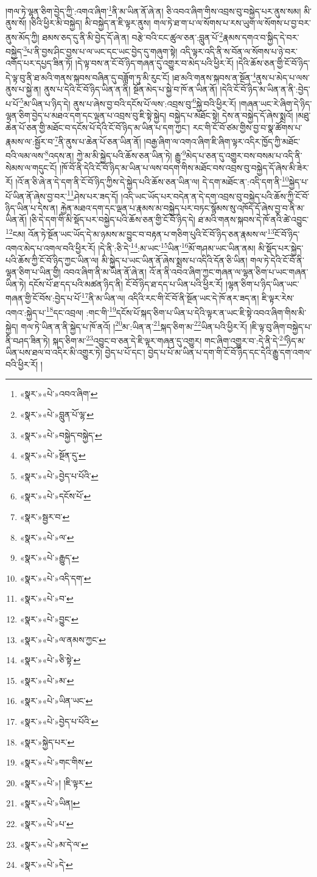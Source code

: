 །གལ་ཏེ་ལྷན་ཅིག་བྱེད་ཀྱི་:འགའ་ཞིག་\footnote{«སྣར་»«པེ་»འབའ་ཞིག་}ནི་མ་ཡིན་ནོ་ཞེ་ན། ཅི་འབའ་ཞིག་གིས་འབྲས་བུ་བསྐྱེད་པར་ནུས་སམ། མི་ནུས་སོ། །ཅིའི་ཕྱིར་མི་བསྐྱེད། མི་བསྐྱེད་ན་ཇི་ལྟར་ནུས། གལ་ཏེ་ཐ་ག་པ་ལ་སོགས་པ་རས་ཡུག་ལ་སོགས་པ་བྱ་བར་ནུས་མོད་ཀྱི། ཐམས་ཅད་དུ་ནི་མི་བྱེད་དོ་ཞེ་ན། བརྩེ་བའི་ངང་ཚུལ་ཅན་:བླུན་པོ་\footnote{«སྣར་»«པེ་»བླུན་པོ་ལྷ་}རྣམས་དགའ་བ་སྐྱིད་དེ་བར་བསྐྱེད་\footnote{«སྣར་»«པེ་»བསྐྱེད་བསྐྱེད་}པ་ནི་བྱས་ཤིང་བྱས་པ་ལ་ཡང་དང་ཡང་བྱེད་དུ་གཞུག་སྟེ། འདི་ལྟར་འདི་ནི་ས་བོན་ལ་སོགས་པ་ཉེ་བར་འགོད་པར་དཔྱད་ཟིན་ཏོ། །དེ་ལྟ་བས་ན་ངོ་བོ་ཉིད་གཞན་དུ་འགྱུར་བ་མེད་པའི་ཕྱིར་རོ། །དེའི་ཆོས་ཅན་གྱི་ངོ་བོ་ཉིད་དེ་ལྟ་བུ་ནི་ཐ་མའི་གནས་སྐབས་བཞིན་དུ་བཟློག་ཏུ་མི་རུང་ངོ། །ཐ་མའི་གནས་སྐབས་ན་སྔོན་\footnote{«སྣར་»«པེ་»སྔོན་དུ་}ནུས་པ་མེད་པ་ལས་ནུས་པ་སྐྱེ་ན། ནུས་པ་དེའི་ངོ་བོ་ཉིད་ཡིན་ན་ནི། སྔོན་མེད་པ་སྐྱེ་བ་ཁོ་ན་ཡིན་ནོ། །དེའི་ངོ་བོ་ཉིད་མ་ཡིན་ན་ནི་:བྱེད་པ་པོ་\footnote{«སྣར་»«པེ་»བྱེད་པ་པོའི་}མ་ཡིན་པ་ཉིད་དེ། ནུས་པ་ཞེས་བྱ་བའི་དངོས་པོ་ལས་:འབྲས་བུ་\footnote{«སྣར་»«པེ་»དངོས་པོ་}སྐྱེ་བའི་ཕྱིར་རོ། །གཞན་ཡང་རེ་ཞིག་དེ་ཉིད་ལྷན་ཅིག་བྱེད་པ་མཐའ་དག་དང་ལྡན་པ་འབྲས་བུ་ཇི་སྟེ་སྐྱེད། བསྐྱེད་པ་མཐོང་སྟེ། དེས་ན་བསྐྱེད་དོ་ཞེས་སྨྲའོ། །མཐུ་ཆེན་པོ་ཅན་གྱི་མཐོང་བ་དངོས་པོ་དེའི་ངོ་བོ་ཉིད་མ་ཡིན་པ་དག་ཀྱང་། རང་གི་ངོ་བོ་ཙམ་གྱིས་བྱ་བ་སྣ་ཚོགས་པ་རྣམས་ལ་:སྦྱོར་བ་\footnote{«སྣར་»སྦྱར་བ་}ནི་ནུས་པ་ཆེན་པོ་ཅན་ཡིན་ནོ། །བརྒྱ་ཞིག་ལ་འགའ་ཞིག་ཇི་ཞིག་ལྟར་འདིར་ཁྱོད་ཀྱི་མཐོང་བའི་ལམ་ལས་\footnote{«སྣར་»«པེ་»ལ་}འདས་ན། ཀྱེ་མ་མི་སྐྱེད་པའི་ཆོས་ཅན་ཡིན་ཏེ། རྒྱུ་\footnote{«སྣར་»«པེ་»རྒྱུད་}མེད་པ་ཅན་དུ་འགྱུར་བས་བསམ་པ་འདི་ནི་སེམས་ལ་གདུང་ངོ། །ཁོ་བོ་ནི་དེའི་ངོ་བོ་ཉིད་མ་ཡིན་པ་ལས་བདག་གིས་མཐོང་བས་འབྲས་བུ་བསྐྱེད་དོ་ཞེས་མི་ཟེར་རོ། །འོ་ན་ཅི་ཞེ་ན་དེ་དག་ནི་ངོ་བོ་ཉིད་ཀྱིས་དེ་སྐྱེད་པའི་ཆོས་ཅན་ཡིན་ལ། དེ་དག་མཐོང་ན་:འདི་དག་ནི་\footnote{«སྣར་»«པེ་»འདི་དག་}སྐྱེད་པ་པོ་ཡིན་ནོ་ཞེས་བྱ་བར་\footnote{«སྣར་»«པེ་»བ་}ཤེས་པར་ཟད་དོ། །འདི་ཡང་ཡོད་པར་བདེན་ན་དེ་དག་འབྲས་བུ་བསྐྱེད་པའི་ཆོས་ཀྱི་ངོ་བོ་ཉིད་ཡིན་པ་དེས་ན། རྐྱེན་མཐའ་དག་དང་ལྡན་པ་རྣམས་མ་བསྐྱེད་པར་བཏང་སྙོམས་སུ་འཁོད་དོ་ཞེས་བྱ་བ་ནི་མ་ཡིན་ནོ། །ཅི་དེ་དག་གི་མི་སྡོད་པར་བསྐྱེད་པའི་ཆོས་ཅན་གྱི་ངོ་བོ་ཉིད་དེ། ཐ་མའི་གནས་སྐབས་དེ་ཁོ་ནའི་ཚེ་འབྱུང་\footnote{«སྣར་»«པེ་»བྱུང་}ངམ། འོན་ཏེ་སྔོན་ཡང་ཡོད་དེ་མ་ཉམས་མ་བྱུང་བ་བརྟན་པ་གཅིག་པུའི་ངོ་བོ་ཉིད་ཅན་རྣམས་ལ་\footnote{«སྣར་»«པེ་»ལ་ནམས་ཀྱང་}ངོ་བོ་ཉིད་འགའ་མེད་པ་འགལ་བའི་ཕྱིར་རོ། །དེ་ནི་:ཅི་དེ་\footnote{«སྣར་»«པེ་»ཅི་སྟེ་}:མ་ཡང་\footnote{«སྣར་»«པེ་»མ་}ཡིན་\footnote{«སྣར་»«པེ་»ཡིན་ཡང་}མོ་གཤམ་ཡང་ཡིན་ནམ། མི་སྡོད་པར་སྐྱེད་པའི་ཆོས་ཀྱི་ངོ་བོ་ཉིད་ཀྱང་ཡིན་ལ། མི་སྐྱེད་པ་ཡང་ཡིན་ནོ་ཞེས་སྨྲས་པ་འདིའི་དོན་ཅི་ཡིན། གལ་ཏེ་དེའི་ངོ་བོ་ནི་ལྷན་ཅིག་པ་ཡིན་གྱི། འབའ་ཞིག་ནི་མ་ཡིན་ནོ་ཞེ་ན། འོ་ན་ནི་འབའ་ཞིག་ཀྱང་གཞན་ལ་ལྷན་ཅིག་པ་ཡང་གཞན་ཡིན་ཏེ། དངོས་པོ་ཐ་དད་པའི་མཚན་ཉིད་ནི། ངོ་བོ་ཉིད་ཐ་དད་པ་ཡིན་པའི་ཕྱིར་རོ། །ལྷན་ཅིག་པ་ཉིད་ཡིན་ཡང་གཞན་གྱི་ངོ་བོས་:བྱེད་པ་པོ་\footnote{«སྣར་»«པེ་»བྱེད་པ་པོའི་}ནི་མ་ཡིན་ལ། འདིའི་རང་གི་ངོ་བོ་ནི་སྔོན་ཡང་དེ་ཁོ་ནར་ཟད་ན། ཇི་ལྟར་རེས་འགའ་:སྐྱེད་པ་\footnote{«སྣར་»སྐྱེད་པར་}དང་འབྲལ། :གང་གི་\footnote{«སྣར་»«པེ་»གང་གིས་}དངོས་པོ་སྐད་ཅིག་པ་ཡིན་པ་དེའི་ལྟར་ན་ཡང་ཇི་སྟེ་འབའ་ཞིག་གིས་མི་སྐྱེད། གལ་ཏེ་ཡིན་ན་ནི་སྐྱེད་པ་ཁོ་ནའོ། །\footnote{«སྣར་»«པེ་»། །ཇི་ལྟར་}མ་:ཡིན་ན་\footnote{«སྣར་»«པེ་»ཡིན། }སྐད་ཅིག་མ་\footnote{«སྣར་»«པེ་»པ་}ཡིན་པའི་ཕྱིར་རོ། །ཇི་ལྟ་བུ་ཞིག་བསྐྱེད་པ་ནི་བཤད་ཟིན་ཏེ། སྐད་ཅིག་མ་\footnote{«སྣར་»«པེ་»མ་དེ་ལ་}འབྱུང་བ་ཅན་དེ་ཇི་ལྟར་གཞན་དུ་འགྱུར། གང་ཞིག་འགྱུར་བ་:དེ་ནི་དེ་\footnote{«སྣར་»«པེ་»དེ་}ཉིད་མ་ཡིན་པས་ཐལ་བ་འདིར་མི་འགྱུར་ཏེ། བྱེད་པ་པོ་དང་། བྱེད་པ་པོ་མ་ཡིན་པ་དག་གི་ངོ་བོ་ཉིད་དང་དེའི་རྒྱུ་དག་འགལ་བའི་ཕྱིར་རོ། །
